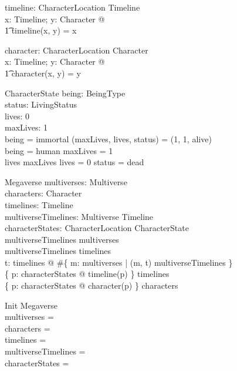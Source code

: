 \documentclass{article}
\begin{document}
\begin{axdef}
timeline: CharacterLocation \fun Timeline \\
\where
\forall x: Timeline; y: Character @ \\
\t1 timeline(x, y) = x \\
\end{axdef}

\begin{axdef}
character: CharacterLocation \fun Character \\
\where
\forall x: Timeline; y: Character @ \\
\t1 character(x, y) = y \\
\end{axdef} 

\begin{schema}{CharacterState}
being: BeingType \\
status: LivingStatus \\
lives: 0   \\ 
maxLives: 1  \\ 
\where
being = immortal \implies (maxLives, lives, status) = (1, 1, alive) \\
being = human \implies maxLives = 1 \\
lives \leq maxLives \land lives = 0 \implies status = dead \\ 
\end{schema}

\begin{schema}{Megaverse}
multiverses: \power Multiverse \\
characters: \power Character \\
timelines: \power Timeline \\ 
multiverseTimelines: Multiverse \rel Timeline \\
characterStates: CharacterLocation \pfun CharacterState \\
\where
\dom multiverseTimelines \subseteq multiverses \\ 
\ran multiverseTimelines \subseteq timelines \\ 
\forall t: timelines @ \#\{ m: multiverses | (m, t) \in multiverseTimelines \}  \\
\{ p: \dom characterStates @ timeline(p) \} \subseteq timelines \\
\{ p: \dom characterStates @ character(p) \} \subseteq characters \\
\end{schema}

\begin{schema}{Init}
Megaverse \\ 
\where
multiverses = \emptyset \\
characters = \emptyset \\ 
timelines = \emptyset \\
multiverseTimelines = \emptyset \\
characterStates = \emptyset \\
\end{schema}
\end{document}
